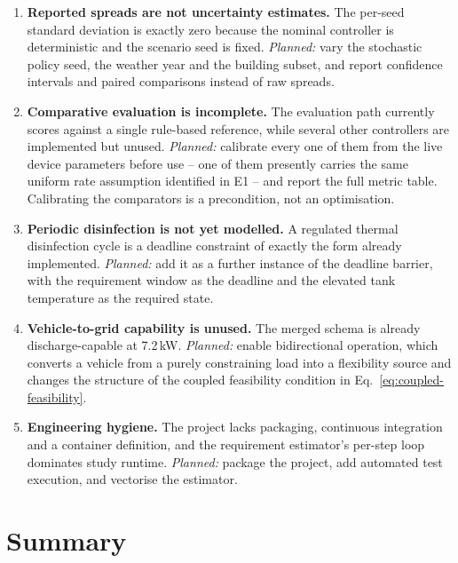 \documentclass[11pt]{article}
\begin{document}
\begin{enumerate}
\item \textbf{Reported spreads are not uncertainty estimates.} The per-seed
standard deviation is exactly zero because the nominal controller is
deterministic and the scenario seed is fixed. \emph{Planned:} vary the stochastic
policy seed, the weather year and the building subset, and report confidence
intervals and paired comparisons instead of raw spreads.

\item \textbf{Comparative evaluation is incomplete.} The evaluation path
currently scores against a single rule-based reference, while several other
controllers are implemented but unused. \emph{Planned:} calibrate every one of
them from the live device parameters before use -- one of them presently carries
the same uniform rate assumption identified in E1 -- and report the full metric
table. Calibrating the comparators is a precondition, not an optimisation.

\item \textbf{Periodic disinfection is not yet modelled.} A regulated thermal
disinfection cycle is a deadline constraint of exactly the form already
implemented. \emph{Planned:} add it as a further instance of the deadline
barrier, with the requirement window as the deadline and the elevated tank
temperature as the required state.

\item \textbf{Vehicle-to-grid capability is unused.} The merged schema is
already discharge-capable at 7.2\,kW. \emph{Planned:} enable bidirectional
operation, which converts a vehicle from a purely constraining load into a
flexibility source and changes the structure of the coupled feasibility condition
in Eq.~\ref{eq:coupled-feasibility}.

\item \textbf{Engineering hygiene.} The project lacks packaging, continuous
integration and a container definition, and the requirement estimator's per-step
loop dominates study runtime. \emph{Planned:} package the project, add automated
test execution, and vectorise the estimator.
\end{enumerate}

\section{Summary}
\label{sec:summary}
\end{document}
